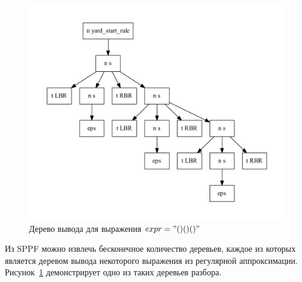 \begin{figure}[!h]
 \centering
 \includegraphics[width=15cm]{pics/sppf3.pdf}
 \caption{Дерево вывода для выражения $expr="()()()"$}
 \label{sppf3}
\end{figure}

Из SPPF можно извлечь бесконечное количество деревьев, каждое из которых является деревом вывода некоторого выражения из регулярной аппроксимации. Рисунок~\ref{sppf3} демонстрирует одно из таких деревьев разбора. 
